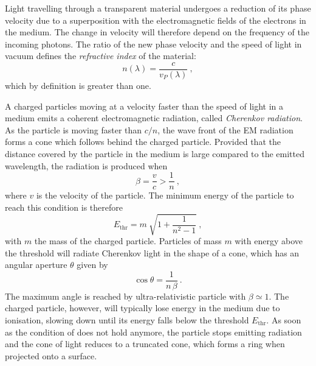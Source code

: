 Light travelling through a transparent material undergoes a reduction of its phase velocity %
due to a superposition with the electromagnetic fields of the electrons in the medium. %
The change in velocity will therefore depend on the frequency of the incoming photons.
The ratio of the new phase velocity and the speed of light in vacuum defines the \emph{refractive index} %
of the material:
\begin{equation}
	\label{eq:ref_index}
	n(\lambda) = \frac{c}{v_P(\lambda)}\ ,
\end{equation}
which by definition is greater than one.

A charged particles moving at a velocity faster than the speed of light in a medium %
emits a coherent electromagnetic radiation, called \emph{Cherenkov radiation}. %
As the particle is moving faster than $c / n$, the wave front of the EM radiation forms a cone %
which follows behind the charged particle.
Provided that the distance covered by the particle in the medium is large compared to the emitted wavelength, %
the radiation is produced when~\cite{Cerenkov:1937vh}
\begin{equation}
	\label{eq:cherenkov}
	\beta = \frac{v}{c} > \frac{1}{n}\ ,
\end{equation}
where $v$ is the velocity of the particle.
The minimum energy of the particle to reach this condition is therefore
\begin{equation}
	\label{eq:cherenkov_threshold}
	E_\text{thr} = m\ \sqrt{1 + \frac{1}{n^2-1}}\ ,
\end{equation}
with $m$ the mass of the charged particle.
Particles of mass $m$ with energy above the threshold will radiate Cherenkov light in the shape of a cone, %
which has an angular aperture $\theta$ given by
\begin{equation}
	\label{eq:cherenkov_angle}
	\cos \theta = \frac{1}{n\,\beta} \ .
\end{equation}
The maximum angle is reached by ultra-relativistic particle with $\beta \simeq 1$.
The charged particle, however, will typically lose energy in the medium due to ionisation, %
slowing down until its energy falls below the threshold $E_\text{thr}$.
As soon as the condition of  does not hold anymore, %
the particle stops emitting radiation and the cone of light reduces to a truncated cone, %
which forms a ring when projected onto a surface.

